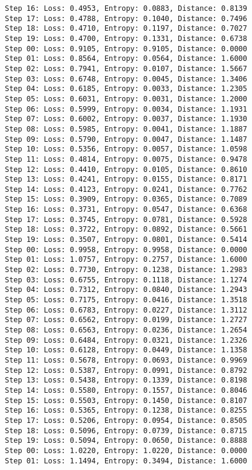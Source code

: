\documentclass[11pt]{article}
\begin{document}
\begin{Verbatim}[commandchars=\\\{\}]
Step 16: Loss: 0.4953, Entropy: 0.0883, Distance: 0.8139
Step 17: Loss: 0.4788, Entropy: 0.1040, Distance: 0.7496
Step 18: Loss: 0.4710, Entropy: 0.1197, Distance: 0.7027
Step 19: Loss: 0.4700, Entropy: 0.1331, Distance: 0.6738
Step 00: Loss: 0.9105, Entropy: 0.9105, Distance: 0.0000
Step 01: Loss: 0.8564, Entropy: 0.0564, Distance: 1.6000
Step 02: Loss: 0.7941, Entropy: 0.0107, Distance: 1.5667
Step 03: Loss: 0.6748, Entropy: 0.0045, Distance: 1.3406
Step 04: Loss: 0.6185, Entropy: 0.0033, Distance: 1.2305
Step 05: Loss: 0.6031, Entropy: 0.0031, Distance: 1.2000
Step 06: Loss: 0.5999, Entropy: 0.0034, Distance: 1.1931
Step 07: Loss: 0.6002, Entropy: 0.0037, Distance: 1.1930
Step 08: Loss: 0.5985, Entropy: 0.0041, Distance: 1.1887
Step 09: Loss: 0.5790, Entropy: 0.0047, Distance: 1.1487
Step 10: Loss: 0.5356, Entropy: 0.0057, Distance: 1.0598
Step 11: Loss: 0.4814, Entropy: 0.0075, Distance: 0.9478
Step 12: Loss: 0.4410, Entropy: 0.0105, Distance: 0.8610
Step 13: Loss: 0.4241, Entropy: 0.0155, Distance: 0.8171
Step 14: Loss: 0.4123, Entropy: 0.0241, Distance: 0.7762
Step 15: Loss: 0.3909, Entropy: 0.0365, Distance: 0.7089
Step 16: Loss: 0.3731, Entropy: 0.0547, Distance: 0.6368
Step 17: Loss: 0.3745, Entropy: 0.0781, Distance: 0.5928
Step 18: Loss: 0.3722, Entropy: 0.0892, Distance: 0.5661
Step 19: Loss: 0.3507, Entropy: 0.0801, Distance: 0.5414
Step 00: Loss: 0.9958, Entropy: 0.9958, Distance: 0.0000
Step 01: Loss: 1.0757, Entropy: 0.2757, Distance: 1.6000
Step 02: Loss: 0.7730, Entropy: 0.1238, Distance: 1.2983
Step 03: Loss: 0.6755, Entropy: 0.1118, Distance: 1.1274
Step 04: Loss: 0.7312, Entropy: 0.0840, Distance: 1.2943
Step 05: Loss: 0.7175, Entropy: 0.0416, Distance: 1.3518
Step 06: Loss: 0.6783, Entropy: 0.0227, Distance: 1.3112
Step 07: Loss: 0.6562, Entropy: 0.0199, Distance: 1.2727
Step 08: Loss: 0.6563, Entropy: 0.0236, Distance: 1.2654
Step 09: Loss: 0.6484, Entropy: 0.0321, Distance: 1.2326
Step 10: Loss: 0.6128, Entropy: 0.0449, Distance: 1.1358
Step 11: Loss: 0.5678, Entropy: 0.0693, Distance: 0.9969
Step 12: Loss: 0.5387, Entropy: 0.0991, Distance: 0.8792
Step 13: Loss: 0.5438, Entropy: 0.1339, Distance: 0.8198
Step 14: Loss: 0.5580, Entropy: 0.1557, Distance: 0.8046
Step 15: Loss: 0.5503, Entropy: 0.1450, Distance: 0.8107
Step 16: Loss: 0.5365, Entropy: 0.1238, Distance: 0.8255
Step 17: Loss: 0.5206, Entropy: 0.0954, Distance: 0.8505
Step 18: Loss: 0.5096, Entropy: 0.0739, Distance: 0.8715
Step 19: Loss: 0.5094, Entropy: 0.0650, Distance: 0.8888
Step 00: Loss: 1.0220, Entropy: 1.0220, Distance: 0.0000
Step 01: Loss: 1.1494, Entropy: 0.3494, Distance: 1.6000

\end{Verbatim}
\end{document}
